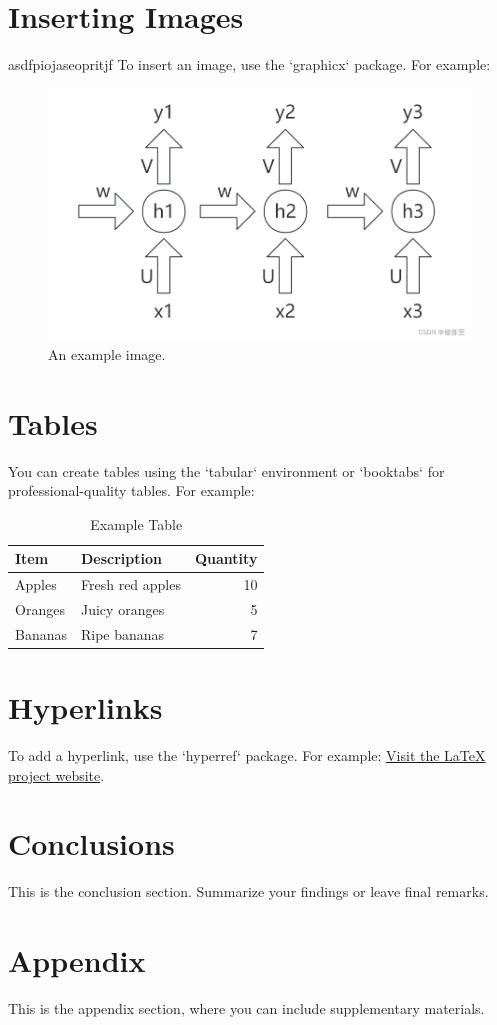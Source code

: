 \documentclass[12pt,a4paper]{article}
\begin{document}
\section{Inserting Images}
asdfpiojaseopritjf
To insert an image, use the `graphicx` package. For example:

\begin{figure}[!htb]
    \centering
    \includegraphics[width=1\textwidth]{./Pic/pic1.png} %
    \caption{An example image.}
    \label{fig:example}
\end{figure}

\section{Tables}
You can create tables using the `tabular` environment or `booktabs` for professional-quality tables. For example:

\begin{table}[h!]
\centering
\caption{Example Table}
\begin{tabular}{@{}llr@{}}
\toprule
\textbf{Item} & \textbf{Description} & \textbf{Quantity} \\ \midrule
Apples        & Fresh red apples     & 10                \\
Oranges       & Juicy oranges        & 5                 \\
Bananas       & Ripe bananas         & 7                 \\ \bottomrule
\end{tabular}
\label{tab:example}
\end{table}

\section{Hyperlinks}
To add a hyperlink, use the `hyperref` package. For example:
\href{https://www.latex-project.org/}{Visit the LaTeX project website}.

\section{Conclusions}
This is the conclusion section. Summarize your findings or leave final remarks.

\newpage
\appendix
\section{Appendix}
This is the appendix section, where you can include supplementary materials.
\end{document}
